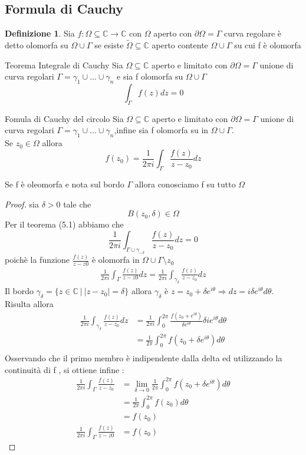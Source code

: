 \documentclass{article}
\theoremstyle{definition}
\newtheorem*{definizione}{Definizione}
\newcommand{\C}{\mathbb{C}}
\newcommand{\norm}[1]{|#1|}
\begin{document}
	\subsection{Formula di Cauchy}
	\begin{definizione}
		Sia $f:\Omega \subseteq \C \rightarrow \C $ con $\Omega$ aperto con $\partial \Omega = \Gamma$ curva regolare è detto olomorfa su $\Omega \cup \Gamma$ se esiste $\tilde{\Omega} \subseteq \C$ aperto contente  $\Omega \cup \Gamma$ su cui f è olomorfa 
	\end{definizione}
	\begin{teo}{Teorema Integrale di Cauchy}{}
		Sia $\Omega \subseteq \C $ aperto e limitato con $\partial \Omega = \Gamma$ unione di curva regolari $\Gamma=\gamma_1 \cup \dots \cup \gamma_n$ e sia f olomorfa su $\Omega \cup \Gamma$
		$$\int_{\Gamma}f(z)dz=0$$
	\end{teo}
	\begin{teo}{Fomula di Cauchy del circolo}{}
			Sia $\Omega \subseteq \C $ aperto e limitato con $\partial \Omega = \Gamma$ unione di curva regolari $\Gamma=\gamma_1 \cup \dots \cup \gamma_n$,infine sia f olomorfa su in $\Omega \cup \Gamma$. \\ Se $z_0 \in \Omega $ allora 
			$$f(z_0)=\frac{1}{2 \pi i } \int_{\Gamma} \frac{f(z)}{z-z_0}dz $$
	\end{teo}
	Se f è oleomorfa e nota sul bordo $\Gamma$ allora conosciamo f su tutto $\Omega$ 
	\begin{proof}
		sia $\delta > 0$ tale che $$B(z_0 , \delta)\in \Omega$$ Per il teorema (5.1) abbiamo che $$\frac{1}{2 \pi i }\int_{\Gamma \cup \gamma_{-\delta}} \frac{f(z)}{z-z_0}dz=0$$ poichè la funzione $ \frac{f(z)}{z-z0}$ è olomorfa in $\Omega \cup \Gamma \setminus z_0$
		\begin{align*}
			\frac{1}{2 \pi i }\int_{\Gamma} \frac{f(z)}{z-z0}dz=\frac{1}{2 \pi i }\int_{\gamma_{\delta}} \frac{f(z)}{z-z_0}dz
		\end{align*}
		Il bordo $\gamma_\delta= \{z \in \C \ |\ \norm{z-z_0}=\delta\}$ allora $\gamma_{\delta}$ è $z=z_0+\delta e^{i\theta}  \Rightarrow dz=i\delta e^{i\theta}d\theta$. \\Risulta allora 
		\begin{align*}
\frac{1}{2 \pi i }\int_{\gamma_{\delta}} \frac{f(z)}{z-z_0}dz &= \frac{1}{2 \pi i }\int_{0}^{2\pi} \frac{f(z_0+e^{i\theta})}{\delta e^{i\theta }}\delta ie^{i\theta } d\theta \\
&=\frac{1}{2 \pi } \int_{0}^{2\pi}f(z_0+\delta e^{i\theta})d\theta\\
		\end{align*}
		Osservando che il primo membro è indipendente dalla delta ed utilizzando la continuità di f , si ottiene infine :
		\begin{align*}
			\frac{1}{2 \pi i }\int_{\Gamma} \frac{f(z)}{z-z_0}&=\lim_{\delta \rightarrow 0} \frac{1}{2 \pi } \int_{0}^{2\pi}f(z_0+\delta e^{i\theta})d\theta\\ 
			&=\frac{1}{2\pi}\int_{0}^{2\pi}f(z_0)d\theta\\ 
			&= f(z_0) \\
			\frac{1}{2 \pi i }	\int_{\Gamma} \frac{f(z)}{z-z0}&=f(z_0)
		\end{align*}
	\end{proof}
\end{document}
